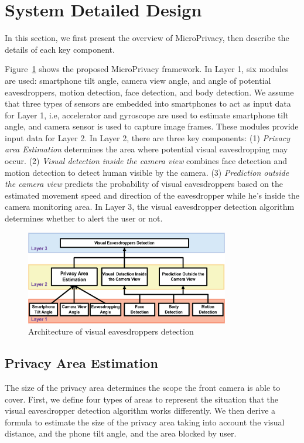 \section{System Detailed Design}
\label{sec:details}

In this section, we first present the overview of MicroPrivacy, then describe the details of each key component.

Figure~\ref{fig:architecture} shows the proposed MicroPrivacy framework.
In  Layer 1,  six modules are used: smartphone tilt angle, camera view angle, and angle of potential eavesdroppers, motion detection, face detection, and body detection.
We assume that three types of sensors are embedded into smartphones to act as input data for Layer 1, i.e, accelerator and gyroscope are used to estimate smartphone tilt angle, and camera sensor is used to capture image frames.
These modules provide input data for Layer 2.
In Layer 2, there are three key components:  (1) \textit{Privacy area Estimation} determines the area where potential visual eavesdropping may occur. (2) \textit{Visual detection inside the camera view} combines face detection and motion detection  to detect human visible by the camera. (3) \textit{Prediction outside the camera view} predicts the probability of visual eavesdroppers based on the estimated movement speed and direction of the eavesdropper while he's inside the camera monitoring area.
In Layer 3,  the visual eavesdropper detection algorithm determines whether to alert the user or not.

\begin{figure}[H]\label{framework}
\centering
\includegraphics[width=3.5in]{framework.eps}
\caption{Architecture of  visual eavesdroppers detection}
\label{fig:architecture}
\end{figure}

\subsection{Privacy Area Estimation}

The size of the privacy area determines the scope the front camera is able  to cover.
First, we  define four types of areas to represent the situation that the visual eavesdropper detection algorithm works differently.
We then derive a formula to estimate the size of the privacy area taking into account  the visual distance, and the phone tilt angle, and the area blocked by user.

